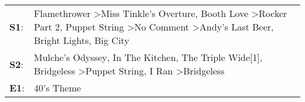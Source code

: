 \begin{supertabular}{p{0.03\textwidth}p{0.92\textwidth}}
 \textbf{S1}:  &  Flamethrower\textsuperscript{} \textgreater \enspace Miss Tinkle's Overture\textsuperscript{}, \enspace Booth Love\textsuperscript{} \textgreater \enspace Rocker Part 2\textsuperscript{}, \enspace Puppet String\textsuperscript{} \textgreater \enspace No Comment\textsuperscript{} \textgreater \enspace Andy's Last Beer\textsuperscript{}, \enspace Bright Lights, Big City\textsuperscript{}  \enspace  \\
 \textbf{S2}:  &                                                                                        Mulche's Odyssey\textsuperscript{}, \enspace In The Kitchen\textsuperscript{}, \enspace The Triple Wide[1]\textsuperscript{}, \enspace Bridgeless\textsuperscript{} \textgreater \enspace Puppet String\textsuperscript{}, \enspace I Ran\textsuperscript{} \textgreater \enspace Bridgeless\textsuperscript{}  \enspace  \\
 \textbf{E1}:  &                                                                                                                                                                                                                                                                                                                                                                          40's Theme\textsuperscript{}  \enspace  \\
\end{supertabular}
